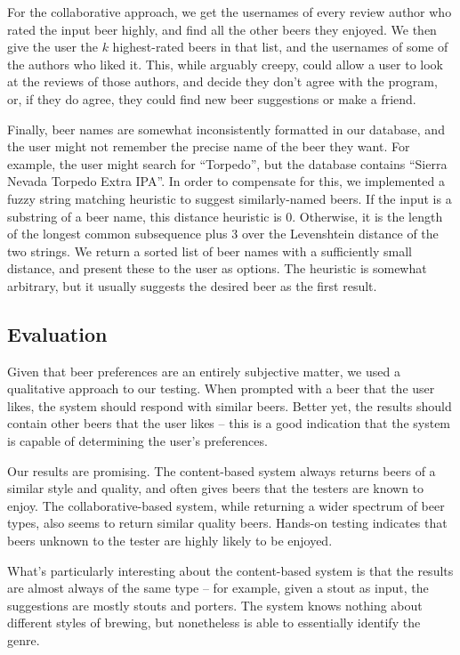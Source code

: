 \documentclass[11pt]{article}
\begin{document}
\begin{itemize}
For the collaborative approach, we get the usernames of every review author who rated the input beer highly, and find all the other beers they enjoyed. We then give the user the $k$ highest-rated beers in that list, and the usernames of some of the authors who liked it. This, while arguably creepy, could allow a user to look at the reviews of those authors, and decide they don't agree with the program, or, if they do agree, they could find new beer suggestions or make a friend.
  
  Finally, beer names are somewhat inconsistently formatted in our database, and the user might not remember the precise name of the beer they want. For example, the user might search for ``Torpedo'', but the database contains ``Sierra Nevada Torpedo Extra IPA''. In order to compensate for this, we implemented a fuzzy string matching heuristic to suggest similarly-named beers. If the input is a substring of a beer name, this distance heuristic is 0. Otherwise, it is the length of the longest common subsequence plus 3 over the Levenshtein distance of the two strings. We return a sorted list of beer names with a sufficiently small distance, and present these to the user as options. The heuristic is somewhat arbitrary, but it usually suggests the desired beer as the first result.
\end{itemize}
\subsection*{Evaluation}
Given that beer preferences are an entirely subjective matter, we used a qualitative approach to our testing. When prompted with a beer that the user likes, the system should respond with similar beers. Better yet, the results should contain other beers that the user likes -- this is a good indication that the system is capable of determining the user's preferences.

Our results are promising. The content-based system always returns beers of a similar style and quality, and often gives beers that the testers are known to enjoy. The collaborative-based system, while returning a wider spectrum of beer types, also seems to return similar quality beers. Hands-on testing indicates that beers unknown to the tester are highly likely to be enjoyed.

What's particularly interesting about the content-based system is that the results are almost always of the same type -- for example, given a stout as input, the suggestions are mostly stouts and porters. The system knows nothing about different styles of brewing, but nonetheless is able to essentially identify the genre.
\end{document}
